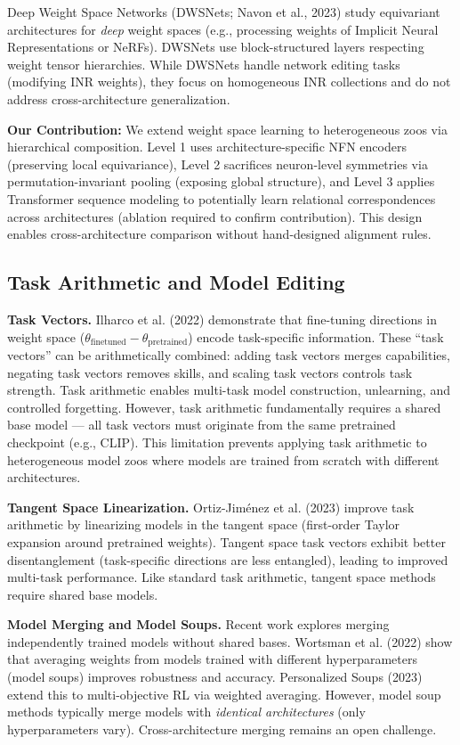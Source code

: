 Deep Weight Space Networks (DWSNets; Navon et al., 2023) study equivariant architectures for \textit{deep} weight spaces (e.g., processing weights of Implicit Neural Representations or NeRFs). DWSNets use block-structured layers respecting weight tensor hierarchies. While DWSNets handle network editing tasks (modifying INR weights), they focus on homogeneous INR collections and do not address cross-architecture generalization.

\textbf{Our Contribution:} We extend weight space learning to heterogeneous zoos via hierarchical composition. Level 1 uses architecture-specific NFN encoders (preserving local equivariance), Level 2 sacrifices neuron-level symmetries via permutation-invariant pooling (exposing global structure), and Level 3 applies Transformer sequence modeling to potentially learn relational correspondences across architectures (ablation required to confirm contribution). This design enables cross-architecture comparison without hand-designed alignment rules.

\subsection{Task Arithmetic and Model Editing}

\textbf{Task Vectors.} Ilharco et al. (2022) demonstrate that fine-tuning directions in weight space ($\theta_{\text{finetuned}} - \theta_{\text{pretrained}}$) encode task-specific information. These ``task vectors'' can be arithmetically combined: adding task vectors merges capabilities, negating task vectors removes skills, and scaling task vectors controls task strength. Task arithmetic enables multi-task model construction, unlearning, and controlled forgetting. However, task arithmetic fundamentally requires a shared base model --- all task vectors must originate from the same pretrained checkpoint (e.g., CLIP). This limitation prevents applying task arithmetic to heterogeneous model zoos where models are trained from scratch with different architectures.

\textbf{Tangent Space Linearization.} Ortiz-Jiménez et al. (2023) improve task arithmetic by linearizing models in the tangent space (first-order Taylor expansion around pretrained weights). Tangent space task vectors exhibit better disentanglement (task-specific directions are less entangled), leading to improved multi-task performance. Like standard task arithmetic, tangent space methods require shared base models.

\textbf{Model Merging and Model Soups.} Recent work explores merging independently trained models without shared bases. Wortsman et al. (2022) show that averaging weights from models trained with different hyperparameters (model soups) improves robustness and accuracy. Personalized Soups (2023) extend this to multi-objective RL via weighted averaging. However, model soup methods typically merge models with \textit{identical architectures} (only hyperparameters vary). Cross-architecture merging remains an open challenge.

